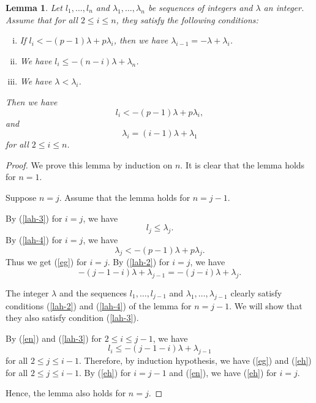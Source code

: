 \documentclass[10pt,a4paper]{amsart}
\numberwithin{equation}{section}
\theoremstyle{plain}
\newtheorem{lemm}[theo]{Lemma}
\theoremstyle{definition}
\begin{document}
  \begin{lemm}\label{lah}
  Let $l_1,\ldots,l_n$ and $\lambda_1,\ldots,\lambda_n$ be sequences of integers and $\lambda$ an integer. Assume that for all $2\leq i\leq n$, they satisfy the following conditions:
  \begin{enumerate}[(i)]
  \item\label{lah-2} If $l_i<-(p-1)\lambda+p\lambda_i$, then we have $\lambda_{i-1}=-\lambda+\lambda_i$.
  \item\label{lah-3} We have $l_i\leq -(n-i)\lambda+\lambda_n$.
  \item\label{lah-4} We have $\lambda<\lambda_i$.
  \end{enumerate}

  Then we have
  \begin{equation}\label{eg}
    l_i<-(p-1)\lambda+p\lambda_i,
  \end{equation}
   and
  \begin{equation}\label{eh}
    \lambda_i=(i-1)\lambda+\lambda_1
  \end{equation}
  for all $2\leq i\leq n$.
\end{lemm}

\begin{proof}
  We prove this lemma by induction on $n$. It is clear that the lemma holds for $n=1$.

  Suppose $n=j$. Assume that the lemma holds for $n=j-1$.
  
  By (\ref{lah-3}) for $i=j$, we have
  \begin{equation}
  l_j\leq \lambda_j.
  \end{equation}
  By (\ref{lah-4}) for $i=j$, we have
  \begin{equation}
  \lambda_j<-(p-1)\lambda+p\lambda_j.
  \end{equation}
  Thus we get (\ref{eg}) for $i=j$.
  By (\ref{lah-2}) for $i=j$, we have
  \begin{equation}\label{en}
  -(j-1-i)\lambda+\lambda_{j-1}=-(j-i)\lambda+\lambda_j.
  \end{equation}

  The integer $\lambda$ and the sequences $l_1,\ldots,l_{j-1}$ and $\lambda_1,\ldots,\lambda_{j-1}$ clearly satisfy conditions (\ref{lah-2}) and (\ref{lah-4}) of the lemma for $n=j-1$. We will show that they also satisfy condition (\ref{lah-3}).

  By (\ref{en}) and (\ref{lah-3}) for $2\leq i\leq j-1$, we have
  \begin{equation}
  l_i\leq-(j-1-i)\lambda+\lambda_{j-1}
  \end{equation}
  for all $2\leq j\leq i-1$. Therefore, by induction hypothesis, we have (\ref{eg}) and (\ref{eh}) for all $2\leq j\leq i-1$. By (\ref{eh}) for $i=j-1$ and (\ref{en}), we have (\ref{eh}) for $i=j$.

  Hence, the lemma also holds for $n=j$.
\end{proof}
\end{document}
